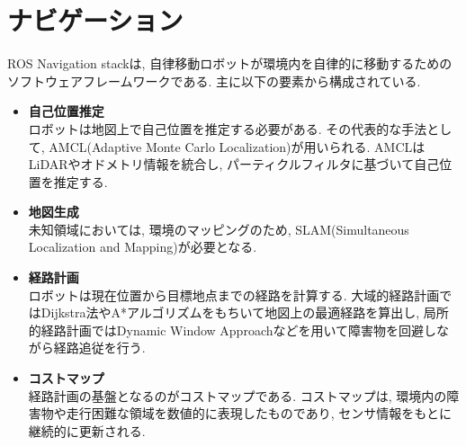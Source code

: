\section{ナビゲーション}
ROS Navigation stackは, 自律移動ロボットが環境内を自律的に移動するためのソフトウェアフレームワークである. 主に以下の要素から構成されている. 
\begin{itemize}
     \item \textbf{自己位置推定}\\
     ロボットは地図上で自己位置を推定する必要がある. その代表的な手法として, AMCL(Adaptive Monte Carlo Localization)が用いられる. 
     AMCLはLiDARやオドメトリ情報を統合し, パーティクルフィルタに基づいて自己位置を推定する. 
     \item \textbf{地図生成}\\
     未知領域においては, 環境のマッピングのため, SLAM(Simultaneous Localization and Mapping)が必要となる. 
     \item \textbf{経路計画}\\
     ロボットは現在位置から目標地点までの経路を計算する. 大域的経路計画ではDijkstra法やA*アルゴリズムをもちいて地図上の最適経路を算出し, 局所的経路計画ではDynamic Window Approachなどを用いて障害物を回避しながら経路追従を行う. 
     \item \textbf{コストマップ}\\
     経路計画の基盤となるのがコストマップである. コストマップは, 環境内の障害物や走行困難な領域を数値的に表現したものであり, センサ情報をもとに継続的に更新される. 
\end{itemize}
